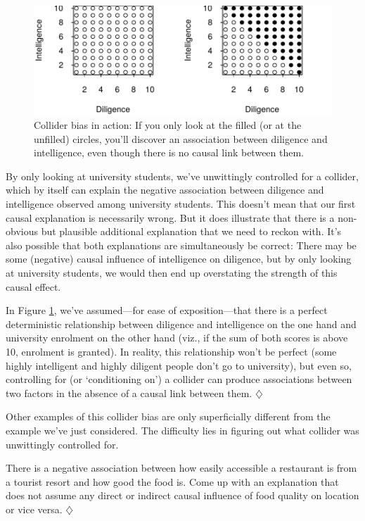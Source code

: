 \documentclass[a4paper]{tufte-book}\usepackage[]{graphicx}\usepackage[]{xcolor}
\newcommand*{\parend}[1][$\diamondsuit$]{%
\leavevmode\unskip\penalty9999 \hbox{}\nobreak\hfill
    \quad\hbox{#1}%
}
\begin{document}
\begin{figure}[htbp]
\includegraphics[width=\textwidth]{figure/selectionbias}
\caption[Selection bias]{Collider bias in action: If you only look at the filled (or at the unfilled) circles, you'll discover an association between diligence and intelligence, even though there is no causal link between them.}
\label{fig:selectionbias}
\end{figure}


By only looking at university students, we've unwittingly controlled for a collider,
which by itself can explain the negative association between diligence and intelligence
observed among university students.
This doesn't mean that our first causal
explanation is necessarily wrong.
But it does illustrate that there is a non-obvious
but plausible additional explanation that we need to reckon with.
It's also possible that both explanations are simultaneously be correct:
There may be some (negative) causal influence of intelligence on diligence,
but by only looking at university students, we would then end up overstating
the strength of this causal effect.

In Figure \ref{fig:selectionbias}, we've assumed---for ease of exposition---that
there is a perfect deterministic relationship between diligence and intelligence
on the one hand and university enrolment on the other hand (viz., if the sum
of both scores is above 10, enrolment is granted). In reality, this relationship
won't be perfect (some highly intelligent and highly diligent people don't go to
university), but even so, controlling for (or `conditioning on') a collider can produce
associations between two factors in the absence of a causal link between them.
\parend

Other examples of this collider bias are only superficially different
from the example we've just considered.
The difficulty lies in figuring out what collider was unwittingly controlled for.

  There is a negative association between how easily accessible a restaurant
  is from a tourist resort and how good the food is.
  Come up with an explanation that does not assume any direct or indirect
  causal influence of food quality on location or vice versa.
\parend
\end{document}
